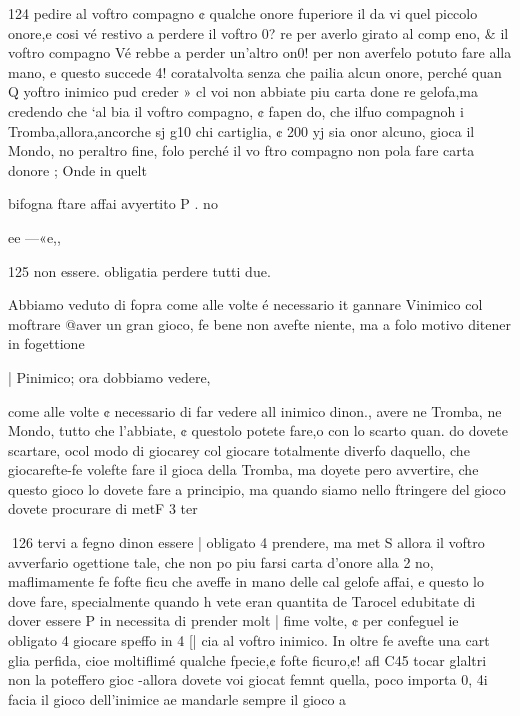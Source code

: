 \documentclass[12pt,a6paper]{article}
\begin{document}
 

 

 

 

 

 

 

 

 

 

 

124
pedire al voftro compagno ¢
qualche onore fuperiore il da
vi quel piccolo onore,e cosi vé
restivo a perdere il voftro 0?
re per averlo girato al comp
eno, & il voftro compagno Vé
rebbe a perder un’altro on0!
per non averfelo potuto fare
alla mano, e questo succede 4!
coratalvolta senza che pailia
alcun onore, perché quan Q
yoftro inimico pud creder » cl
voi non abbiate piu carta done
re gelofa,ma credendo che ‘al
bia il voftro compagno, ¢ fapen
do, che ilfuo compagnoh i
Tromba,allora,ancorche sj g10
chi cartiglia, ¢ 200 yj sia onor
alcuno, gioca il Mondo, no
peraltro fine, folo perché il vo
ftro compagno non pola fare
carta donore ; Onde in quelt

bifogna ftare affai avyertito P
. no

ee —«e,,
  

125
non essere. obligatia perdere
tutti due.

Abbiamo veduto di fopra come alle volte é necessario it
gannare Vinimico col moftrare
@aver un gran gioco, fe bene
non avefte niente, ma a folo
motivo ditener in fogettione

| Pinimico; ora dobbiamo vedere,

come alle volte ¢ necessario di
far vedere all inimico dinon.,
avere ne Tromba, ne Mondo,
tutto che l’abbiate, ¢ questolo
potete fare,o con lo scarto quan.
do dovete scartare, ocol modo
di giocarey col giocare totalmente diverfo daquello, che
giocarefte-fe volefte fare il gioca
della Tromba, ma doyete pero
avvertire, che questo gioco lo
dovete fare a principio, ma
quando siamo nello ftringere del
gioco dovete procurare di metF 3 ter

 

 

 
126
tervi a fegno dinon essere |
obligato 4 prendere, ma met
S allora il voftro avverfario
ogettione tale, che non po
piu farsi carta d’onore alla 2
no, maflimamente fe fofte ficu
che aveffe in mano delle cal
gelofe affai, e questo lo dove
fare, specialmente quando h
vete eran quantita de Tarocel
edubitate di dover essere P
in necessita di prender molt
|  fime volte, ¢ per confeguel
ie obligato 4 giocare speffo in 4
[| cia al voftro inimico.
In oltre fe avefte una cart
glia perfida, cioe moltiflimé
qualche fpecie,¢ fofte ficuro,¢!
afl C45 tocar
glaltri non la poteffero gioc
-allora dovete voi giocat femnt
quella, poco importa 0,
4i facia il gioco dell’inimice ae
mandarle sempre il gioco a
\end{document}
